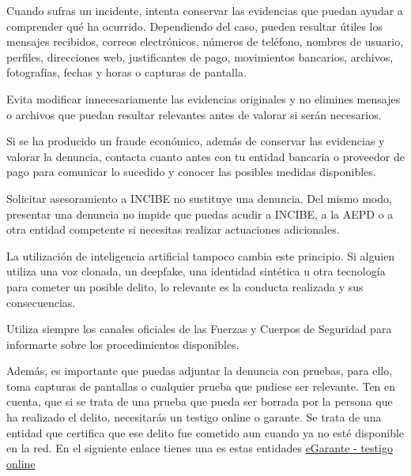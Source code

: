 \documentclass[
  spanish,
  a4paper,
  openany]{book}
\begin{document}
Cuando sufras un incidente, intenta conservar las evidencias que puedan ayudar a comprender qué ha ocurrido. Dependiendo del caso, pueden resultar útiles los mensajes recibidos, correos electrónicos, números de teléfono, nombres de usuario, perfiles, direcciones web, justificantes de pago, movimientos bancarios, archivos, fotografías, fechas y horas o capturas de pantalla.

Evita modificar innecesariamente las evidencias originales y no elimines mensajes o archivos que puedan resultar relevantes antes de valorar si serán necesarios.

Si se ha producido un fraude económico, además de conservar las evidencias y valorar la denuncia, contacta cuanto antes con tu entidad bancaria o proveedor de pago para comunicar lo sucedido y conocer las posibles medidas disponibles.

Solicitar asesoramiento a INCIBE no sustituye una denuncia. Del mismo modo, presentar una denuncia no impide que puedas acudir a INCIBE, a la AEPD o a otra entidad competente si necesitas realizar actuaciones adicionales.

La utilización de inteligencia artificial tampoco cambia este principio. Si alguien utiliza una voz clonada, un deepfake, una identidad sintética u otra tecnología para cometer un posible delito, lo relevante es la conducta realizada y sus consecuencias.

Utiliza siempre los canales oficiales de las Fuerzas y Cuerpos de Seguridad para informarte sobre los procedimientos disponibles.

Además, es importante que puedas adjuntar la denuncia con pruebas, para ello, toma capturas de pantallas o cualquier prueba que pudiese ser relevante. Ten en cuenta, que si se trata de una prueba que pueda ser borrada por la persona que ha realizado el delito, necesitarás un testigo online o garante. Se trata de una entidad que certifica que ese delito fue cometido aun cuando ya no esté disponible en la red. En el siguiente enlace tienes una es estas entidades \href{https://www.egarante.com/}{eGarante - testigo online}


\end{document}
